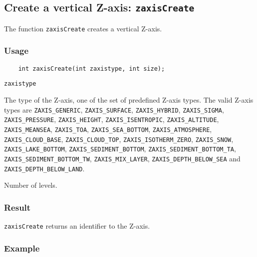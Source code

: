 

\subsection{Create a vertical Z-axis: {\tt zaxisCreate}}
\label{zaxisCreate}

The function {\tt zaxisCreate} creates a vertical Z-axis.

\subsubsection*{Usage}

\begin{verbatim}
    int zaxisCreate(int zaxistype, int size);
\end{verbatim}

\hspace*{4mm}\begin{minipage}[]{15cm}
\begin{deflist}{\tt zaxistype\ }
\item[{\tt zaxistype}]
The type of the Z-axis, one of the set of predefined {\CDI} Z-axis types.
                      The valid {\CDI} Z-axis types are {\tt ZAXIS\_GENERIC}, {\tt ZAXIS\_SURFACE},
                      {\tt ZAXIS\_HYBRID}, {\tt ZAXIS\_SIGMA}, {\tt ZAXIS\_PRESSURE}, {\tt ZAXIS\_HEIGHT},
                      {\tt ZAXIS\_ISENTROPIC}, {\tt ZAXIS\_ALTITUDE}, {\tt ZAXIS\_MEANSEA}, {\tt ZAXIS\_TOA},
                      {\tt ZAXIS\_SEA\_BOTTOM}, {\tt ZAXIS\_ATMOSPHERE}, {\tt ZAXIS\_CLOUD\_BASE},
                      {\tt ZAXIS\_CLOUD\_TOP}, {\tt ZAXIS\_ISOTHERM\_ZERO}, {\tt ZAXIS\_SNOW},
                      {\tt ZAXIS\_LAKE\_BOTTOM}, {\tt ZAXIS\_SEDIMENT\_BOTTOM}, {\tt ZAXIS\_SEDIMENT\_BOTTOM\_TA},
                      {\tt ZAXIS\_SEDIMENT\_BOTTOM\_TW}, {\tt ZAXIS\_MIX\_LAYER},
                      {\tt ZAXIS\_DEPTH\_BELOW\_SEA} and {\tt ZAXIS\_DEPTH\_BELOW\_LAND}.
\item[{\tt size}]
Number of levels.

\end{deflist}
\end{minipage}

\subsubsection*{Result}

{\tt zaxisCreate} returns an identifier to the Z-axis.


\subsubsection*{Example}

